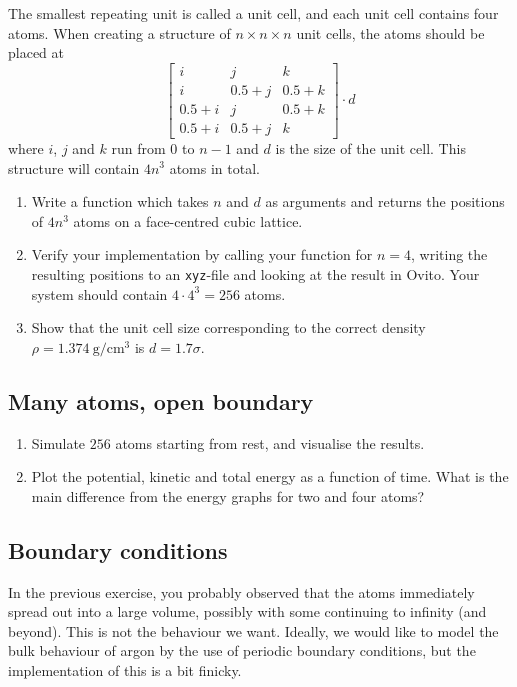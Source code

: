 \documentclass[11pt,british,a4paper]{report}
\begin{document}
The smallest repeating unit is called a unit cell, and each unit cell contains four atoms. When creating a structure of \(n\times n\times n\) unit cells, the atoms should be placed at
\[
    \begin{bmatrix}
        i & j & k \\
        i & 0.5+j & 0.5+k \\
        0.5+i & j & 0.5+k \\
        0.5+i & 0.5+j & k
    \end{bmatrix}\cdot d
\]
where \(i\), \(j\) and \(k\) run from \(0\) to \(n-1\) and \(d\) is the size of the unit cell. This structure will contain \(4n^3\) atoms in total.
\begin{enumerate}[label=\roman*.]
    \item Write a function which takes \(n\) and \(d\) as arguments and returns the positions of \(4n^3\) atoms on a face-centred cubic lattice.
    \item Verify your implementation by calling your function for \(n=4\), writing the resulting positions to an \texttt{xyz}-file and looking at the result in Ovito. Your system should contain \(4\cdot4^3=256\) atoms.
    \item Show that the unit cell size corresponding to the correct density \(\rho=\SI{1.374}{\gram\per\cm\tothe3}\) is \(d=1.7 \sigma\).
\end{enumerate}

\subsection{Many atoms, open boundary}
\begin{enumerate}[label=\roman*.]
    \item Simulate \(256\) atoms starting from rest, and visualise the results.
    \item Plot the potential, kinetic and total energy as a function of time. What is the main difference from the energy graphs for two and four atoms?
\end{enumerate}

\subsection{Boundary conditions}
In the previous exercise, you probably observed that the atoms immediately spread out into a large volume, possibly with some continuing to infinity (and beyond). This is not the behaviour we want. Ideally, we would like to model the bulk behaviour of argon by the use of periodic boundary conditions, but the implementation of this is a bit finicky.
\end{document}
